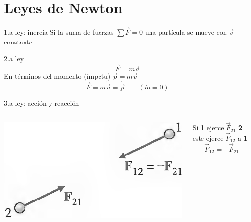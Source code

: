 \documentclass[serif]{beamer}
\begin{document}
\section{Leyes de Newton}


\begin{frame}
\begin{block}{1.a ley: inercia}
Si la suma de fuerzas \(\sum \vec{F} = 0\) una partícula se mueve con \(\vec{v}\) constante.
\end{block}
\pause
\begin{block}{2.a ley}
\[
\vec{F}= m \vec{a}
\]
\pause
En términos del momento {\tiny (ímpetu)}  \(\vec{p}= m \vec{v}\)
\[
\vec{F} = m \dot{\vec{v}}= \dot{\vec{p}}\qquad (\dot{m}=0 )
\]
\end{block}
\pause
\begin{block}{3.a ley: acción y reacción}
\begin{columns}[c]
	\begin{column}{0.35\textwidth}
		\includegraphics[width=\textwidth]{taylor1_5}
	\end{column}
	\begin{column}{0.65\textwidth}
		Si \textbf{1} ejerce \(\vec{F}_{21}\)  \textbf{2} este ejerce \(\vec{F}_{12}\) a \textbf{1}
		\[
			\vec{F}_{12} = - \vec{F}_{21}
		\]
	\end{column}
\end{columns}
\end{block}

\end{frame}
\end{document}
